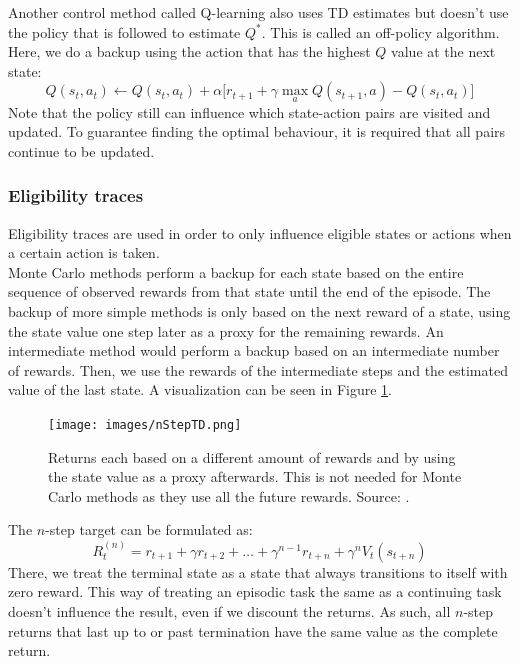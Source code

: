 \documentclass[a4paper]{article}
\begin{document}
Another control method called Q-learning also uses TD estimates but doesn't use the policy that is followed to estimate $Q^*$. This is called an off-policy algorithm. Here, we do a backup using the action that has the highest $Q$ value at the next state:
\begin{equation}
Q(s_t,a_t) \leftarrow Q(s_t,a_t) + \alpha \big[ r_{t+1} + \gamma \max_{a} Q(s_{t+1}, a) - Q(s_t,a_t) \big]
\end{equation}
Note that the policy still can influence which state-action pairs are visited and updated. To guarantee finding the optimal behaviour, it is required that all pairs continue to be updated.\\

\subsubsection{Eligibility traces}
Eligibility traces are used in order to only influence eligible states or actions when a certain action is taken.\\
Monte Carlo methods perform a backup for each state based on the entire sequence of observed rewards from that state until the end of the episode. The backup of more simple methods is only based on the next reward of a state, using the state value one step later as a proxy for the remaining rewards. An intermediate method would perform a backup based on an intermediate number of rewards. Then, we use the rewards of the intermediate steps and the estimated value of the last state. A visualization can be seen in Figure \ref{fig:nStepTD}.
\begin{figure}[H]
\texttt{[image: images/nStepTD.png]}
\caption{Returns each based on a different amount of rewards and by using the state value as a proxy afterwards. This is not needed for Monte Carlo methods as they use all the future rewards. Source: \cite{Sutton1998ReinforcementIntroductionb}.}
\label{fig:nStepTD}
\end{figure}
The $n$-step target can be formulated as:
\begin{equation}
R_t^{(n)} = r_{t+1} + \gamma r_{t+2} + \dots + \gamma^{n-1}r_{t+n} + \gamma^n V_t(s_{t+n})
\end{equation}
There, we treat the terminal state as a state that always transitions to itself with zero reward. This way of treating an episodic task the same as a continuing task doesn't influence the result, even if we discount the returns. As such, all $n$-step returns that last up to or past termination have the same value as the complete return.\\
\end{document}
